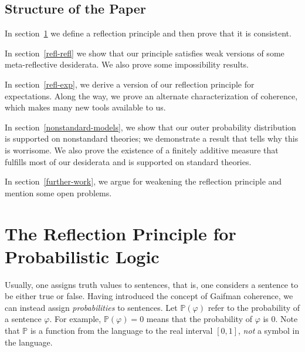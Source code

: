 \documentclass[12pt]{article}
\newcommand{\PP}{\mathbb{P}}
\newcommand{\vp}{\varphi}
\theoremstyle{plain}
\theoremstyle{definition}
\theoremstyle{remark}
\begin{document}
\subsection{Structure of the Paper}
In section~\ref{refl-cons} we define a reflection principle and then prove that it is consistent. 

In section~\ref{refl-refl} we show that our principle satisfies weak versions of some meta-reflective desiderata. We also prove some impossibility results.

In section~\ref{refl-exp}, we derive a version of our reflection principle for expectations. Along the way, we prove an alternate characterization of coherence, which makes many new tools available to us. 

In section~\ref{nonstandard-models}, we show that our outer probability distribution is supported on nonstandard theories; we demonstrate a result that tells why this is worrisome. We also prove the existence of a finitely additive measure that fulfills most of our desiderata and is supported on standard theories. 

In section~\ref{further-work}, we argue for weakening the reflection principle and mention some open problems. 

\section{The Reflection Principle for Probabilistic Logic}
\label{refl-cons}




Usually, one assigns truth values to sentences, that is, one considers a sentence to be either true or false. Having introduced the concept of Gaifman coherence, we can instead assign \emph{probabilities} to sentences. Let $\PP(\vp)$ refer to the probability of a sentence $\vp$. For example, $\PP(\vp)=0$ means that the probability of $\vp$ is $0$. Note that $\PP$ is a function from the language to the real interval $[0,1]$, \emph{not} a symbol in the language.
\end{document}
